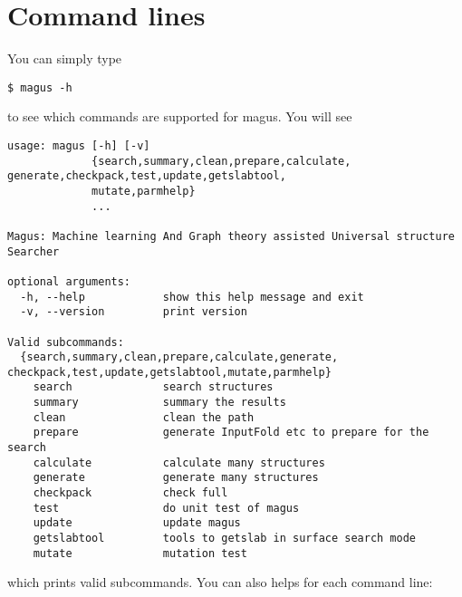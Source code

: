 \documentclass[12pt,oneside]{book}
\begin{document}
\section{Command lines}
You can simply type
\begin{tcolorbox}
    \begin{verbatim}
$ magus -h
    \end{verbatim}
\end{tcolorbox}
to see which commands are supported for magus. You will see
\begin{tcolorbox}
    \begin{verbatim}
usage: magus [-h] [-v]
             {search,summary,clean,prepare,calculate, generate,checkpack,test,update,getslabtool,
             mutate,parmhelp}
             ...

Magus: Machine learning And Graph theory assisted Universal structure Searcher

optional arguments:
  -h, --help            show this help message and exit
  -v, --version         print version

Valid subcommands:
  {search,summary,clean,prepare,calculate,generate, checkpack,test,update,getslabtool,mutate,parmhelp}
    search              search structures
    summary             summary the results
    clean               clean the path
    prepare             generate InputFold etc to prepare for the search
    calculate           calculate many structures
    generate            generate many structures
    checkpack           check full
    test                do unit test of magus
    update              update magus
    getslabtool         tools to getslab in surface search mode
    mutate              mutation test
    \end{verbatim}
\end{tcolorbox}
which prints valid subcommands. You can also helps for each command line:
\end{document}
